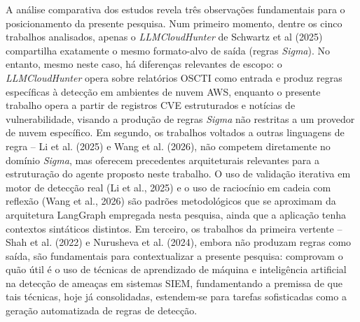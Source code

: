 A análise comparativa dos estudos revela três observações fundamentais para o posicionamento da presente pesquisa. 
Num primeiro momento, dentre os cinco trabalhos analisados, apenas o \textit{LLMCloudHunter} de Schwartz et al (2025) compartilha exatamente o mesmo formato-alvo de saída (regras \textit{Sigma}). 
No entanto, mesmo neste caso, há diferenças relevantes de escopo: o \textit{LLMCloudHunter} opera sobre relatórios OSCTI como entrada e produz regras específicas à detecção em ambientes de nuvem AWS, enquanto o presente trabalho opera a partir de registros CVE estruturados e notícias de vulnerabilidade, visando a produção de regras \textit{Sigma} não restritas a um provedor de nuvem específico. 
Em segundo, os trabalhos voltados a outras linguagens de regra -- Li et al. (2025) e Wang et al. (2026), não competem diretamente no domínio \textit{Sigma}, mas oferecem precedentes arquiteturais relevantes para a estruturação do agente proposto neste trabalho. 
O uso de validação iterativa em motor de detecção real (Li et al., 2025) e o uso de raciocínio em cadeia com reflexão (Wang et al., 2026) são padrões metodológicos que se aproximam da arquitetura \gls{LangGraph} empregada nesta pesquisa, ainda que a aplicação tenha contextos sintáticos distintos. 
Em terceiro, os trabalhos da primeira vertente -- Shah et al. (2022) e Nurusheva et al. (2024), embora não produzam regras como saída, são fundamentais para contextualizar a presente pesquisa: comprovam o quão útil é o uso de técnicas de aprendizado de máquina e inteligência artificial na detecção de ameaças em sistemas \gls{SIEM}, fundamentando a premissa de que tais técnicas, hoje já consolidadas, estendem-se para tarefas sofisticadas como a geração automatizada de regras de detecção.

